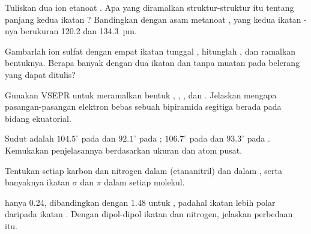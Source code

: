 \begin{exercise}[$\star\star$]\label{exo:b1:lewis-resonance-vsepr:5}
Tuliskan dua  ion etanoat . Apa yang
diramalkan struktur-struktur itu tentang panjang kedua ikatan ?
Bandingkan dengan asam metanoat , yang kedua ikatan
-nya berukuran 120.2 dan \qty{134.3}{pm}.
\end{exercise}

\begin{exercise}[$\star\star$]\label{exo:b1:lewis-resonance-vsepr:6}
Gambarlah  ion sulfat  dengan empat ikatan
tunggal , hitunglah , dan ramalkan bentuknya.
Berapa banyak  dengan dua ikatan  dan tanpa
muatan pada belerang yang dapat ditulis?
\end{exercise}

\begin{exercise}[$\star\star$]\label{exo:b1:lewis-resonance-vsepr:7}
Gunakan VSEPR untuk meramalkan bentuk , , ,
dan . Jelaskan mengapa pasangan-pasangan elektron bebas sebuah
bipiramida segitiga berada pada bidang ekuatorial.
\end{exercise}

\begin{exercise}[$\star\star$]\label{exo:b1:lewis-resonance-vsepr:8}
Sudut  adalah $104.5^\circ$ pada  dan $92.1^\circ$
pada ; $106.7^\circ$ pada  dan $93.3^\circ$ pada
. Kemukakan penjelasannya berdasarkan ukuran dan
 atom pusat.
\end{exercise}

\begin{exercise}[$\star\star$]\label{exo:b1:lewis-resonance-vsepr:9}
Tentukan  setiap karbon dan nitrogen dalam 
(etananitril) dan dalam , serta banyaknya ikatan
$\sigma$ dan $\pi$ dalam setiap molekul.
\end{exercise}

\begin{exercise}[$\star\star\star$]\label{exo:b1:lewis-resonance-vsepr:10}
  hanya \qty{0.24}{\debye}, dibandingkan dengan
\qty{1.48}{\debye} untuk , padahal ikatan  lebih polar
daripada ikatan . Dengan dipol-dipol ikatan dan  nitrogen, jelaskan perbedaan itu.
\end{exercise}


